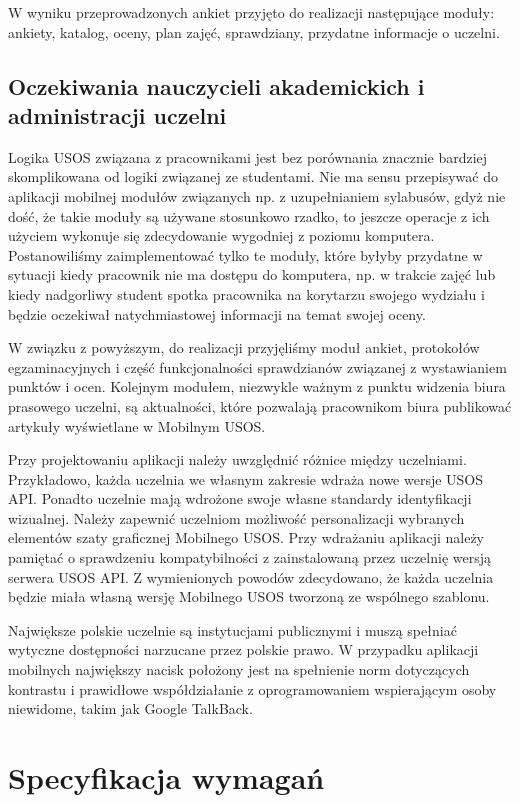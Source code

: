 \documentclass{pracamgr}
\begin{document}
W wyniku przeprowadzonych ankiet przyjęto do realizacji następujące moduły:
ankiety, katalog, oceny, plan zajęć, sprawdziany, przydatne informacje o uczelni.

\section{Oczekiwania nauczycieli akademickich i administracji uczelni}

Logika USOS związana z pracownikami jest bez porównania znacznie bardziej
skomplikowana od logiki związanej ze studentami. Nie ma sensu przepisywać do
aplikacji mobilnej modułów związanych np. z uzupełnianiem sylabusów, gdyż
nie dość, że takie moduły są używane stosunkowo rzadko, to jeszcze operacje
z ich użyciem wykonuje się zdecydowanie wygodniej z poziomu komputera. Postanowiliśmy
zaimplementować tylko te moduły, które byłyby przydatne w sytuacji kiedy pracownik
nie ma dostępu do komputera, np. w trakcie zajęć lub kiedy nadgorliwy student
spotka pracownika na korytarzu swojego wydziału i będzie oczekiwał natychmiastowej
informacji na temat swojej oceny.

W związku z powyższym, do realizacji przyjęliśmy moduł ankiet, protokołów
egzaminacyjnych i część funkcjonalności sprawdzianów związanej z wystawianiem
punktów i ocen. Kolejnym modułem, niezwykle ważnym z punktu widzenia biura prasowego
uczelni, są aktualności, które pozwalają pracownikom biura publikować artykuły
wyświetlane w Mobilnym USOS.

Przy projektowaniu aplikacji należy uwzględnić różnice między uczelniami.
Przykładowo, każda uczelnia we własnym zakresie wdraża nowe wersje USOS API.
Ponadto uczelnie mają wdrożone swoje własne standardy identyfikacji wizualnej.
Należy zapewnić uczelniom możliwość personalizacji wybranych elementów szaty
graficznej Mobilnego USOS. Przy wdrażaniu aplikacji należy pamiętać o
sprawdzeniu kompatybilności z zainstalowaną przez uczelnię wersją serwera USOS API.
Z wymienionych powodów zdecydowano, że każda uczelnia będzie miała własną
wersję Mobilnego USOS tworzoną ze wspólnego szablonu.

Największe polskie uczelnie są instytucjami publicznymi i muszą spełniać wytyczne
dostępności narzucane przez polskie prawo. W przypadku aplikacji mobilnych
największy nacisk położony jest na spełnienie norm dotyczących kontrastu i prawidłowe
współdziałanie z oprogramowaniem wspierającym osoby niewidome, takim jak Google
TalkBack.

\chapter{Specyfikacja wymagań}
\end{document}
